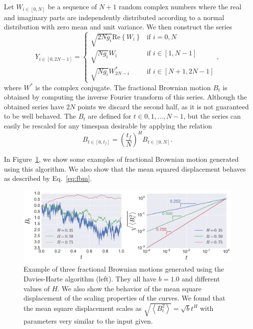 Let $W_{i\in[0,N]}$ be a sequence of $N+1$ random complex numbers where the
real and imaginary parts are independently distributed according to a normal
distribution with zero mean and unit variance. We then construct the series
\begin{equation}
    Y_{i\in[0,2N-1]}=\begin{cases}
        \sqrt{2Ng_{i}}\mbox{Re}\left\{ W_{i}\right\}  & \mbox{if } i=0,N\\
        \sqrt{Ng_{i}}W_{i} & \mbox{if } i\in\left[1, N-1\right]\\
        \sqrt{Ng_{i}}W_{2N-i}^{*} & \mbox{if } i\in\left[N+1, 2N-1\right]
    \end{cases},
\end{equation}
where $W^{*}$ is the complex conjugate. The fractional Brownian motion $B_t$ is
obtained by computing the inverse Fourier transform of this series. Although
the obtained series have $2N$ points we discard the second half, as it is not
guaranteed to be well behaved. The $B_t$ are defined for $t\in{0,1,\ldots,N-1}$,
but the series can easily be rescaled for any timespan desirable by applying
the relation
\begin{equation}
    B_{t\in[0,t_{f}]}={\left(\frac{t_{f}}{N}\right)}^{H}B_{t\in[0,N]}.
\end{equation}

In Figure~\ref{fig:fbm}, we show some examples of fractional Brownian motion
generated using this algorithm. We also show that the mean squared displacement
behaves as described by Eq.~\ref{eq:fbm}.

\begin{figure}
\begin{center}
    \includegraphics[scale=0.45]{chapters/ch6-asle/figs/fbm}
\end{center}
\caption{Example of three fractional Brownian motions generated using the
    Davies-Harte algorithm (left). They all have $b=1.0$ and different values
    of $H$. We also show the behavior of the mean square displacement of the
    scaling properties of the curves. We found that the mean square displacement
    scales as $\sqrt{\left\langle B_t^2\right\rangle}=\sqrt{b}t^H$ with
    parameters very similar to the input given.}
\label{fig:fbm}
\end{figure}


